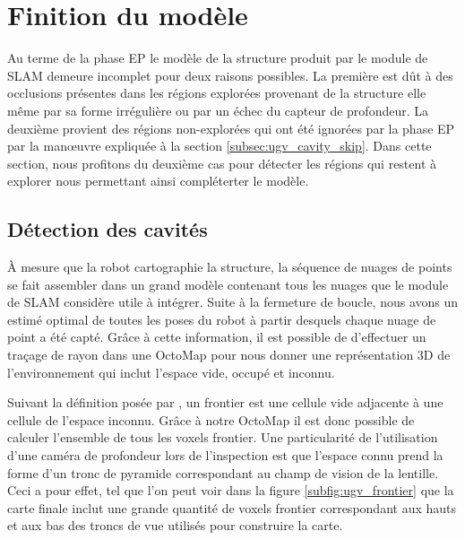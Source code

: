 \section{Finition du modèle} \label{sec:cavity_exploration}

Au terme de la phase EP le modèle de la structure produit par le module de SLAM demeure incomplet pour deux raisons possibles. La première est dût à des occlusions présentes dans les régions explorées provenant de la structure elle même par sa forme irrégulière ou par un échec du capteur de profondeur. La deuxième provient des régions non-explorées qui ont été ignorées par la phase EP par la man\oe uvre expliquée à la section \ref{subsec:ugv_cavity_skip}. Dans cette section, nous profitons du deuxième cas pour détecter les régions qui restent à explorer nous permettant ainsi compléterter le modèle.

\subsection{Détection des cavités}

À mesure que la robot cartographie la structure, la séquence de nuages de points se fait assembler dans un grand modèle contenant tous les nuages que le module de SLAM considère utile à intégrer. Suite à la fermeture de boucle, nous avons un estimé optimal de toutes les poses du robot à partir desquels chaque nuage de point a été capté. Grâce à cette information, il est possible de d'effectuer un traçage de rayon dans une OctoMap \citep{Hornung2013} pour nous donner une représentation 3D de l'environnement qui inclut l'espace vide, occupé et inconnu.

Suivant la définition posée par \citep{Yamauchi1997}, un frontier est une cellule vide adjacente à une cellule de l'espace inconnu. Grâce à notre OctoMap il est donc possible de calculer l'ensemble de tous les voxels frontier. Une particularité de l'utilisation d'une caméra de profondeur lors de l'inspection est que l'espace connu prend la forme d'un tronc de pyramide correspondant au champ de vision de la lentille. Ceci a pour effet, tel que l'on peut voir dans la figure \ref{subfig:ugv_frontier} que la carte finale inclut une grande quantité de voxels frontier correspondant aux hauts et aux bas des troncs de vue utilisés pour construire la carte.

